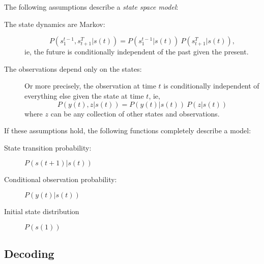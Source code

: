 \documentclass[12pt]{article}
\newcommand{\ti}[2]{{#1}{(#2)}}                         %
\newcommand{\ts}[4]{{#1}_{#3}^{#4}} %
\begin{document}
The following assumptions describe a \emph{state space model}:
\begin{description}
\item[The state dynamics are Markov:]
  \begin{equation}
    \label{eq:Markov}
    P(\ts{s}{\tau}{1}{t-1},\ts{s}{\tau}{t+1}{T}|\ti{s}{t}) =
    P(\ts{s}{\tau}{1}{t-1}|\ti{s}{t}) ~ P(\ts{s}{\tau}{t+1}{T}|\ti{s}{t}),
  \end{equation}
  ie, the future is conditionally independent of the past given the present.
\item[The observations depend only on the states:] Or more precisely,
  the observation at time $t$ is conditionally independent of
  everything else given the state at time $t$, ie,
  \begin{equation}
    \label{eq:IndependentY}
    P(\ti{y}{t},z|\ti{s}{t}) =  P(\ti{y}{t}|\ti{s}{t}) ~  P(z|\ti{s}{t})
  \end{equation}
  where $z$ can be any collection of other states and observations.
\end{description}
If these assumptions hold, the following functions completely describe
a model:
\begin{description}
\item[State transition probability:] $P(\ti{s}{t+1}|\ti{s}{t})$
\item[Conditional observation probability:] $P(\ti{y}{t}|\ti{s}{t})$
\item[Initial state distribution] $P(\ti{s}{1})$
\end{description}

\subsection*{Decoding}
\label{sec:decoding}
\end{document}
